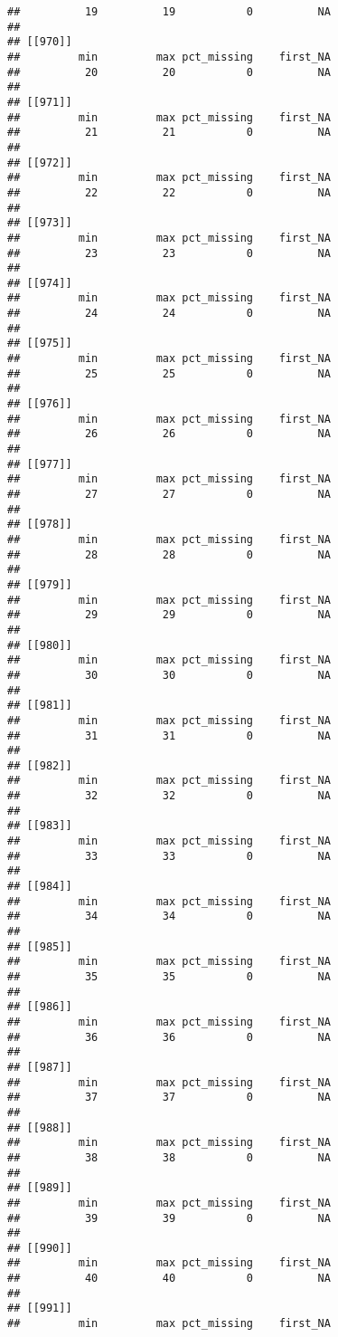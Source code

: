 \documentclass[
]{article}
\begin{document}
\begin{verbatim}
##          19          19           0          NA 
## 
## [[970]]
##         min         max pct_missing    first_NA 
##          20          20           0          NA 
## 
## [[971]]
##         min         max pct_missing    first_NA 
##          21          21           0          NA 
## 
## [[972]]
##         min         max pct_missing    first_NA 
##          22          22           0          NA 
## 
## [[973]]
##         min         max pct_missing    first_NA 
##          23          23           0          NA 
## 
## [[974]]
##         min         max pct_missing    first_NA 
##          24          24           0          NA 
## 
## [[975]]
##         min         max pct_missing    first_NA 
##          25          25           0          NA 
## 
## [[976]]
##         min         max pct_missing    first_NA 
##          26          26           0          NA 
## 
## [[977]]
##         min         max pct_missing    first_NA 
##          27          27           0          NA 
## 
## [[978]]
##         min         max pct_missing    first_NA 
##          28          28           0          NA 
## 
## [[979]]
##         min         max pct_missing    first_NA 
##          29          29           0          NA 
## 
## [[980]]
##         min         max pct_missing    first_NA 
##          30          30           0          NA 
## 
## [[981]]
##         min         max pct_missing    first_NA 
##          31          31           0          NA 
## 
## [[982]]
##         min         max pct_missing    first_NA 
##          32          32           0          NA 
## 
## [[983]]
##         min         max pct_missing    first_NA 
##          33          33           0          NA 
## 
## [[984]]
##         min         max pct_missing    first_NA 
##          34          34           0          NA 
## 
## [[985]]
##         min         max pct_missing    first_NA 
##          35          35           0          NA 
## 
## [[986]]
##         min         max pct_missing    first_NA 
##          36          36           0          NA 
## 
## [[987]]
##         min         max pct_missing    first_NA 
##          37          37           0          NA 
## 
## [[988]]
##         min         max pct_missing    first_NA 
##          38          38           0          NA 
## 
## [[989]]
##         min         max pct_missing    first_NA 
##          39          39           0          NA 
## 
## [[990]]
##         min         max pct_missing    first_NA 
##          40          40           0          NA 
## 
## [[991]]
##         min         max pct_missing    first_NA 

\end{verbatim}
\end{document}
